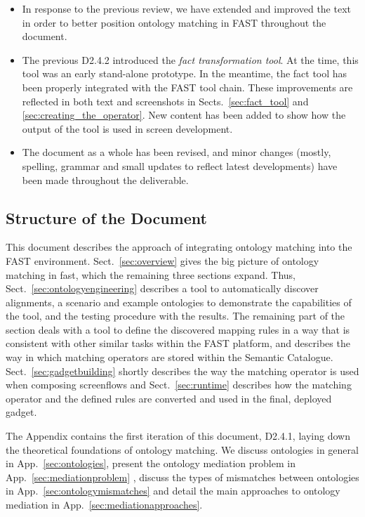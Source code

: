 \documentclass{fast_latex}
\begin{document}
\begin{itemize}
	\item In response to the previous review, we have extended and improved the text in order to better position ontology matching in FAST throughout the document.
	\item The previous D2.4.2 introduced the \emph{fact transformation tool}. At the time, this tool was an early stand-alone prototype. In the meantime, the fact tool has been properly integrated with the FAST tool chain. These improvements are reflected in both text and screenshots in Sects.~\ref{sec:fact_tool} and \ref{sec:creating_the_operator}. New content has been added to show how the output of the tool is used in screen development.
	\item The document as a whole has been revised, and minor changes (mostly, spelling, grammar and small updates to reflect latest developments) have been made throughout the deliverable.
\end{itemize}


\subsection{Structure of the Document}
This document describes the approach of integrating ontology matching into the FAST environment. Sect.~\ref{sec:overview} gives the big picture of ontology matching in fast, which the remaining three sections expand. Thus, Sect.~\ref{sec:ontologyengineering} describes a tool to automatically discover alignments, a scenario and example ontologies to demonstrate the capabilities of the tool, and the testing procedure with the results. The remaining part of the section deals with a tool to define the discovered mapping rules in a way that is consistent with other similar tasks within the FAST platform, and describes the way in which matching operators are stored within the Semantic Catalogue. Sect.~\ref{sec:gadgetbuilding} shortly describes the way the matching operator is used when composing screenflows and Sect.~\ref{sec:runtime} describes how the matching operator and the defined rules are converted and used in the final, deployed gadget.

The Appendix contains the first iteration of this document, D2.4.1, laying down the theoretical foundations of ontology matching. We discuss ontologies in general in App.~\ref{sec:ontologies}, present the ontology mediation problem in App.~\ref{sec:mediationproblem} , discuss the types  of mismatches between ontologies in App.~\ref{sec:ontologymismatches} and detail the main approaches to ontology mediation in App.~\ref{sec:mediationapproaches}.
\end{document}
